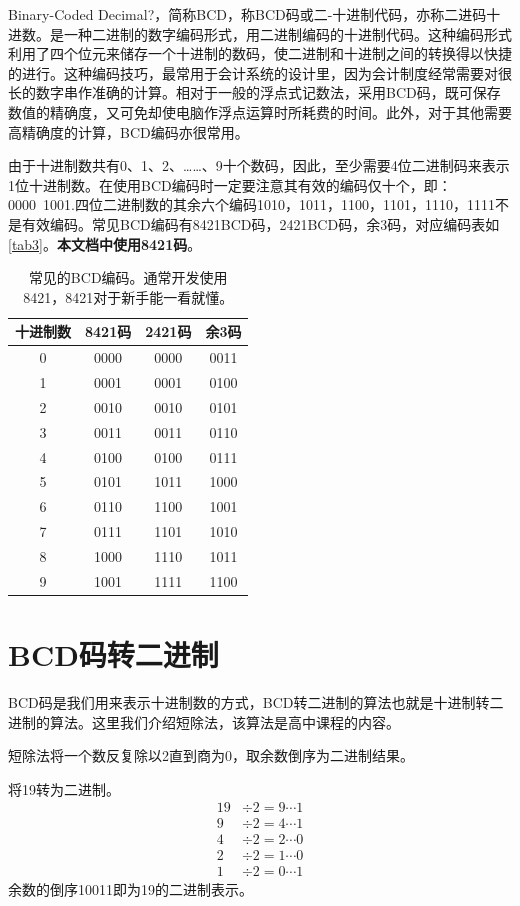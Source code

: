 Binary-Coded Decimal?，简称BCD，称BCD码或二-十进制代码，亦称二进码十进数。是一种二进制的数字编码形式，用二进制编码的十进制代码。这种编码形式利用了四个位元来储存一个十进制的数码，使二进制和十进制之间的转换得以快捷的进行。这种编码技巧，最常用于会计系统的设计里，因为会计制度经常需要对很长的数字串作准确的计算。相对于一般的浮点式记数法，采用BCD码，既可保存数值的精确度，又可免却使电脑作浮点运算时所耗费的时间。此外，对于其他需要高精确度的计算，BCD编码亦很常用。

由于十进制数共有0、1、2、……、9十个数码，因此，至少需要4位二进制码来表示1位十进制数。在使用BCD编码时一定要注意其有效的编码仅十个，即：0000~1001.四位二进制数的其余六个编码1010，1011，1100，1101，1110，1111不是有效编码。常见BCD编码有8421BCD码，2421BCD码，余3码，对应编码表如\autoref{tab3}。\textbf{本文档中使用8421码}。
\begin{table}[!ht]
\centering
\begin{tabular}{|c|c|c|c|}
\hline
十进制数&8421码&2421码&余3码\\\hline
0&0000&0000&0011\\\hline
1&0001&0001&0100\\\hline
2&0010&0010&0101\\\hline
3&0011&0011&0110\\\hline
4&0100&0100&0111\\\hline
5&0101&1011&1000\\\hline
6&0110&1100&1001\\\hline
7&0111&1101&1010\\\hline
8&1000&1110&1011\\\hline
9&1001&1111&1100\\\hline
\end{tabular}
\caption{常见的BCD编码。通常开发使用8421，8421对于新手能一看就懂。}\label{tab3}
\end{table}

\section{BCD码转二进制}
BCD码是我们用来表示十进制数的方式，BCD转二进制的算法也就是十进制转二进制的算法。这里我们介绍短除法，该算法是高中课程的内容。

短除法将一个数反复除以2直到商为0，取余数倒序为二进制结果。
\begin{example}
将19转为二进制。
\begin{align*}
19&\div2=9\cdots1\\
9&\div2=4\cdots1\\
4&\div2=2\cdots0\\
2&\div2=1\cdots0\\
1&\div2=0\cdots1
\end{align*}
余数的倒序10011即为19的二进制表示。
\end{example}

